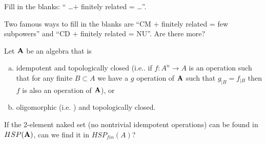 \begin{question}
  Fill in the blanks: `` \dots $+$ finitely related = \dots''.
\end{question}
\begin{context}
Two famous ways to fill in the blanks are 
``CM $+$ finitely related = few subpowers'' and ``CD $+$ finitely related =
NU''. Are there more?
\end{context}
\begin{question}
Let ${\mathbf{A}}$ be an algebra that is
\begin{enumerate}[a)]
\item idempotent and topologically closed (i.e.. if $f\colon A^n\to A$ is an
operation such that for any finite $B\subset A$ we have a $g$ operation of
${\mathbf{A}}$ such that $g_{|B}=f_{|B}$ then $f$ is also an operation of ${\mathbf{A}}$), or
\item oligomorphic (i.e. ) and topologically closed.
\end{enumerate}
If the 2-element naked set (no nontrivial
idempotent operations) can be found in $HSP({\mathbf{A}})$, can we find it in
$HSP_{fin}(A)$? 
\end{question}

